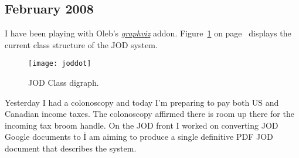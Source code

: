 \subsection{February 2008}

\vspace{.15in}

I have been playing with Oleb's \href{http://www.graphviz.org}{\emph{graphviz}} addon. 
Figure~\ref{eps:joddot} on page~\pageref{eps:joddot} displays the current class structure of
the JOD system.  


\begin{figure}[htbp]
  \centering
  \texttt{[image: joddot]}
  \caption[JOD Classes]{JOD Class digraph.}
  \label{eps:joddot}
\end{figure}


\vspace{.15in}

Yesterday I had a colonoscopy and today I'm preparing to pay both US and Canadian income
taxes.  The colonoscopy affirmed there is room up there for the incoming tax broom handle.
On the JOD front I worked on converting JOD Google documents to \LaTeXe\.  I am aiming to
produce a single definitive PDF JOD document that describes the system.